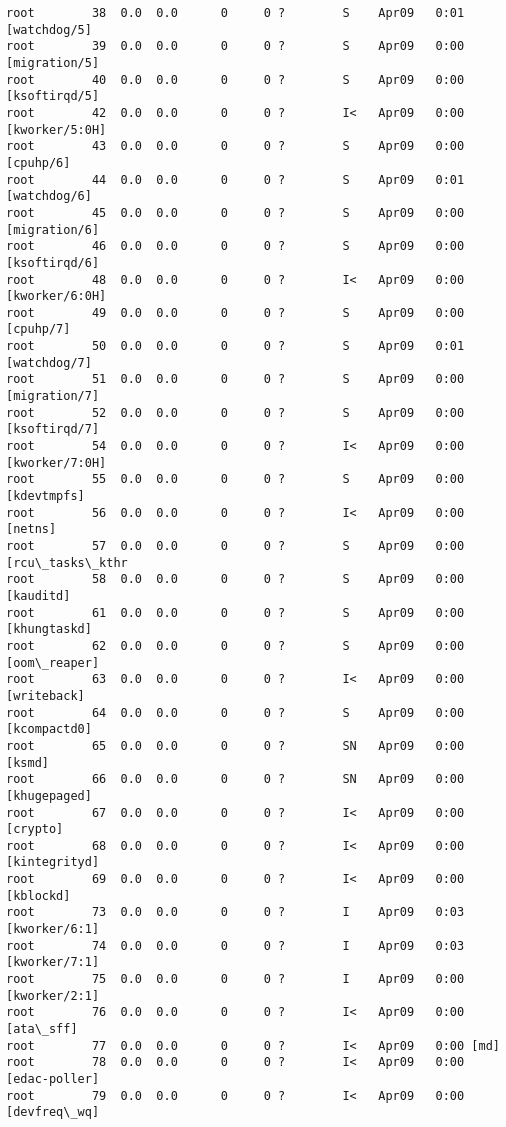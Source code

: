 \documentclass[11pt]{article}
\begin{document}
\begin{Verbatim}[commandchars=\\\{\}]
root        38  0.0  0.0      0     0 ?        S    Apr09   0:01 [watchdog/5]
root        39  0.0  0.0      0     0 ?        S    Apr09   0:00 [migration/5]
root        40  0.0  0.0      0     0 ?        S    Apr09   0:00 [ksoftirqd/5]
root        42  0.0  0.0      0     0 ?        I<   Apr09   0:00 [kworker/5:0H]
root        43  0.0  0.0      0     0 ?        S    Apr09   0:00 [cpuhp/6]
root        44  0.0  0.0      0     0 ?        S    Apr09   0:01 [watchdog/6]
root        45  0.0  0.0      0     0 ?        S    Apr09   0:00 [migration/6]
root        46  0.0  0.0      0     0 ?        S    Apr09   0:00 [ksoftirqd/6]
root        48  0.0  0.0      0     0 ?        I<   Apr09   0:00 [kworker/6:0H]
root        49  0.0  0.0      0     0 ?        S    Apr09   0:00 [cpuhp/7]
root        50  0.0  0.0      0     0 ?        S    Apr09   0:01 [watchdog/7]
root        51  0.0  0.0      0     0 ?        S    Apr09   0:00 [migration/7]
root        52  0.0  0.0      0     0 ?        S    Apr09   0:00 [ksoftirqd/7]
root        54  0.0  0.0      0     0 ?        I<   Apr09   0:00 [kworker/7:0H]
root        55  0.0  0.0      0     0 ?        S    Apr09   0:00 [kdevtmpfs]
root        56  0.0  0.0      0     0 ?        I<   Apr09   0:00 [netns]
root        57  0.0  0.0      0     0 ?        S    Apr09   0:00 [rcu\_tasks\_kthr
root        58  0.0  0.0      0     0 ?        S    Apr09   0:00 [kauditd]
root        61  0.0  0.0      0     0 ?        S    Apr09   0:00 [khungtaskd]
root        62  0.0  0.0      0     0 ?        S    Apr09   0:00 [oom\_reaper]
root        63  0.0  0.0      0     0 ?        I<   Apr09   0:00 [writeback]
root        64  0.0  0.0      0     0 ?        S    Apr09   0:00 [kcompactd0]
root        65  0.0  0.0      0     0 ?        SN   Apr09   0:00 [ksmd]
root        66  0.0  0.0      0     0 ?        SN   Apr09   0:00 [khugepaged]
root        67  0.0  0.0      0     0 ?        I<   Apr09   0:00 [crypto]
root        68  0.0  0.0      0     0 ?        I<   Apr09   0:00 [kintegrityd]
root        69  0.0  0.0      0     0 ?        I<   Apr09   0:00 [kblockd]
root        73  0.0  0.0      0     0 ?        I    Apr09   0:03 [kworker/6:1]
root        74  0.0  0.0      0     0 ?        I    Apr09   0:03 [kworker/7:1]
root        75  0.0  0.0      0     0 ?        I    Apr09   0:00 [kworker/2:1]
root        76  0.0  0.0      0     0 ?        I<   Apr09   0:00 [ata\_sff]
root        77  0.0  0.0      0     0 ?        I<   Apr09   0:00 [md]
root        78  0.0  0.0      0     0 ?        I<   Apr09   0:00 [edac-poller]
root        79  0.0  0.0      0     0 ?        I<   Apr09   0:00 [devfreq\_wq]

\end{Verbatim}
\end{document}
